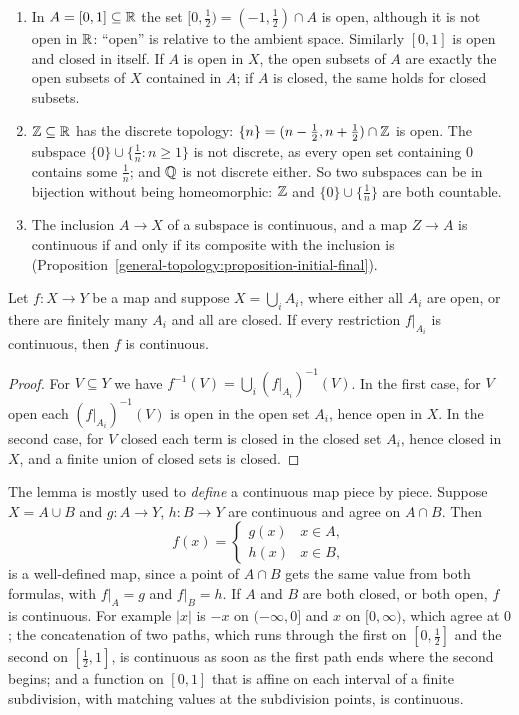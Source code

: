 \begin{example}\label{general-topology:example-subspaces}
\begin{enumerate}
\item In $A = [0, 1] \subseteq \mathbb{R}$ the set $[0, \frac12) = (-1, \frac12) \cap A$ is open, although it is not open in $\mathbb{R}$: ``open'' is relative to the ambient space. Similarly $[0, 1]$ is open and closed in
itself. If $A$ is open in $X$, the open subsets of $A$ are exactly the open subsets of $X$ contained in $A$; if $A$ is closed, the same holds for closed subsets.
\item $\mathbb{Z} \subseteq \mathbb{R}$ has the discrete topology: $\{n\} = (n - \frac12, n + \frac12) \cap \mathbb{Z}$ is open. The subspace $\{0\} \cup \{\frac1n : n \geq 1\}$ is not discrete, as every open set containing
$0$ contains some $\frac1n$; and $\mathbb{Q}$ is not discrete either. So two subspaces can be in bijection without being homeomorphic: $\mathbb{Z}$ and $\{0\} \cup \{\frac1n\}$ are both countable.
\item The inclusion $A \to X$ of a subspace is continuous, and a map $Z \to A$ is continuous if and only if its composite with the inclusion is (Proposition~\ref{general-topology:proposition-initial-final}).
\end{enumerate}
\end{example}

\begin{lemma}\label{general-topology:lemma-pasting}
Let $f \colon X \to Y$ be a map and suppose $X = \bigcup_i A_i$, where either all $A_i$ are open, or there are finitely many $A_i$ and all are closed.
If every restriction $f|_{A_i}$ is continuous, then $f$ is continuous.
\end{lemma}

\begin{proof}
For $V \subseteq Y$ we have $f^{-1}(V) = \bigcup_i (f|_{A_i})^{-1}(V)$. In the first case, for $V$ open each $(f|_{A_i})^{-1}(V)$ is open in the open
set $A_i$, hence open in $X$. In the second case, for $V$ closed each term is closed in the closed set $A_i$, hence closed in $X$, and a finite union of
closed sets is closed.
\end{proof}

The lemma is mostly used to \emph{define} a continuous map piece by piece. Suppose $X = A \cup B$ and $g \colon A \to Y$, $h \colon B \to Y$ are continuous and agree on $A \cap B$. Then
\[
f(x) = \begin{cases} g(x) & x \in A,\\ h(x) & x \in B,\end{cases}
\]
is a well-defined map, since a point of $A \cap B$ gets the same value from both formulas, with $f|_A = g$ and $f|_B = h$. If $A$ and $B$ are both closed, or both open, $f$ is continuous. For example
$|x|$ is $-x$ on $(-\infty, 0]$ and $x$ on $[0, \infty)$, which agree at $0$; the concatenation of two paths, which runs through the first on $[0, \frac12]$ and the second on $[\frac12, 1]$, is continuous as soon as
the first path ends where the second begins; and a function on $[0, 1]$ that is affine on each interval of a finite subdivision, with matching values at the subdivision points, is continuous.

